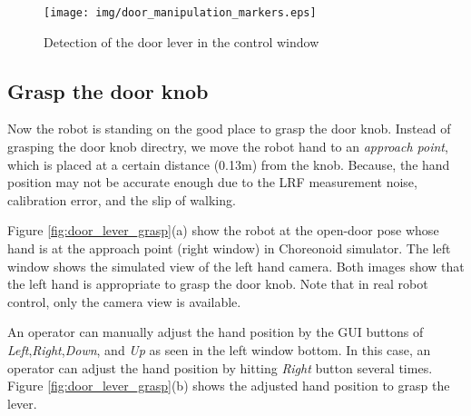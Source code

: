 \begin{figure}[t]
  \centering
  \texttt{[image: img/door\_manipulation\_markers.eps]}
  \caption{Detection of the door lever in the control window}
  \label{fig:door_manip_markers}
\end{figure}
		

\subsection{Grasp the door knob}
%
Now the robot is standing on the good place to grasp the door knob.
Instead of grasping the door knob directry, we move the robot hand to an {\it approach point},
which is placed at a certain distance (0.13m) from the knob. 
Because, the hand position may not be accurate enough due to the LRF measurement noise, calibration error,
and the slip of walking.

Figure \ref{fig:door_lever_grasp}(a) show the robot at the open-door pose whose hand is at the approach point (right window) in Choreonoid simulator. The left window shows the simulated view of the left hand camera. Both images show that the left hand is appropriate to grasp the door knob. Note that in real robot control, only the camera view is available. 

 An operator can manually adjust the hand position by the GUI buttons of 
{\it Left},{\it Right},{\it Down}, and {\it Up} as seen in the left window bottom. In this case, an operator
can adjust the hand position by hitting {\it Right} button several times.
Figure \ref{fig:door_lever_grasp}(b) shows the adjusted hand position to grasp the lever.

